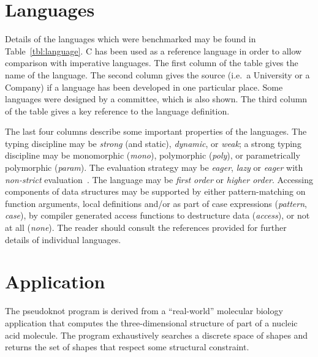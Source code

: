 \section{Languages}
\label{sec:languages}
Details of the languages which were benchmarked may be found in
Table~\ref{tbl:language}. C has been used as a reference language in
order to allow comparison with imperative languages.  The first column
of the table gives the name of the language. The second column gives
the source (i.e.\ a University or a Company) if a language has been
developed in one particular place. Some languages were designed by a
committee, which is also shown. The third column of the table gives a
key reference to the language definition.

The last four columns describe some important properties of the
languages. The typing discipline may be {\it strong} (and static),
{\it dynamic}, or {\it weak}; a strong typing discipline may be
monomorphic ({\it mono}), polymorphic ({\it poly}), or parametrically
polymorphic ({\it param}).  The evaluation strategy may be {\it
eager}, {\it lazy} or {\it eager} with {\it non-strict}
evaluation~\cite{Nik90a}. The language may be {\it first order} or
{\it higher order}.  Accessing components of data structures may be
supported by either pattern-matching on function arguments, local
definitions and/or as part of case expressions ({\em pattern},
{\em case}), by compiler generated access functions to destructure data
({\em access}), or not at all ({\em none}). The reader should consult
the references provided for further details of individual languages.


\section{Application}
\label{sec:application}
The pseudoknot program is derived from a ``real-world'' molecular
biology application that computes the three-dimensional structure of
part of a nucleic acid molecule. The program exhaustively searches a
discrete space of shapes and returns the set of shapes that respect
some structural constraint.

